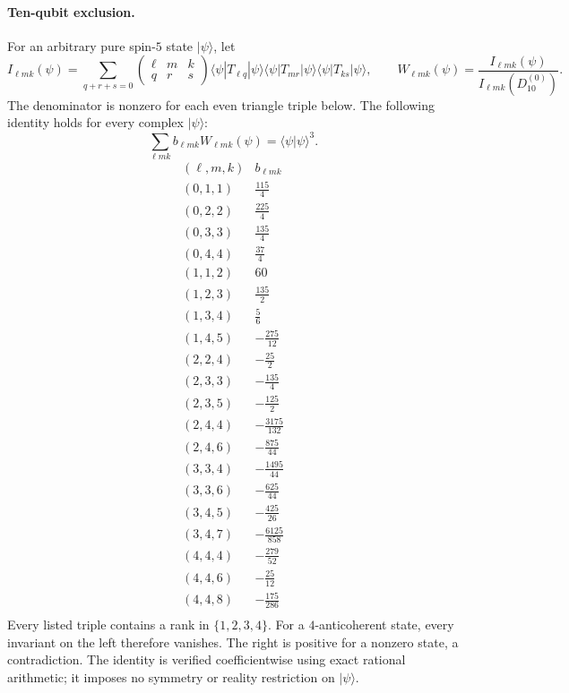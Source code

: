 \paragraph{Ten-qubit exclusion.}
For an arbitrary pure spin-$5$ state $|\psi\rangle$, let
\[
 I_{\ell m k}(\psi)=\sum_{q+r+s=0}
 \begin{pmatrix}\ell&m&k\\q&r&s\end{pmatrix}
 \langle\psi|T_{\ell q}|\psi\rangle
 \langle\psi|T_{mr}|\psi\rangle
 \langle\psi|T_{ks}|\psi\rangle,
 \qquad
 W_{\ell m k}(\psi)=\frac{I_{\ell m k}(\psi)}{I_{\ell m k}(D_{10}^{(0)})}.
\]
The denominator is nonzero for each even triangle triple below. The following identity holds for every complex $|\psi\rangle$:
\[
 \sum_{\ell m k}b_{\ell m k}W_{\ell m k}(\psi)=\langle\psi|\psi\rangle^3.
\]
\[
\begin{array}{c|r}
(\ell,m,k)&b_{\ell m k}\\\hline
(0,1,1) & \frac{115}{4} \\
(0,2,2) & \frac{225}{4} \\
(0,3,3) & \frac{135}{4} \\
(0,4,4) & \frac{37}{4} \\
(1,1,2) & 60 \\
(1,2,3) & \frac{135}{2} \\
(1,3,4) & \frac{5}{6} \\
(1,4,5) & -\frac{275}{12} \\
(2,2,4) & -\frac{25}{2} \\
(2,3,3) & -\frac{135}{4} \\
(2,3,5) & -\frac{125}{2} \\
(2,4,4) & -\frac{3175}{132} \\
(2,4,6) & -\frac{875}{44} \\
(3,3,4) & -\frac{1495}{44} \\
(3,3,6) & -\frac{625}{44} \\
(3,4,5) & -\frac{425}{26} \\
(3,4,7) & -\frac{6125}{858} \\
(4,4,4) & -\frac{279}{52} \\
(4,4,6) & -\frac{25}{12} \\
(4,4,8) & -\frac{175}{286} \\
\end{array}
\]
Every listed triple contains a rank in $\{1,2,3,4\}$. For a $4$-anticoherent state, every invariant on the left therefore vanishes. The right is positive for a nonzero state, a contradiction. The identity is verified coefficientwise using exact rational arithmetic; it imposes no symmetry or reality restriction on $|\psi\rangle$.

